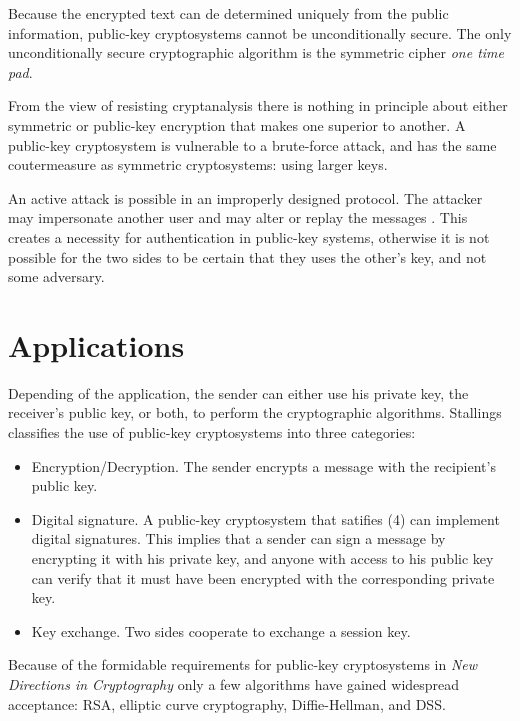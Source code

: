 \documentclass[english,titlepage,11pt]{article}
\begin{document}
Because the encrypted text can de determined uniquely from the public information, public-key cryptosystems cannot be unconditionally secure\cite{diffie76}. The only unconditionally secure cryptographic algorithm is the symmetric cipher \emph{one time pad}\cite{kahn67}. 

From the view of resisting cryptanalysis there is nothing in principle about either symmetric or public-key encryption that makes one superior to another\cite{stallings06}. A public-key cryptosystem is vulnerable to a brute-force attack, and has the same coutermeasure as symmetric cryptosystems: using larger keys.

An active attack is possible in an improperly designed protocol. The attacker may impersonate another user and may alter or replay the messages \cite{dolev83,menezes01}. This creates a necessity for authentication in public-key systems, otherwise it is not possible for the two sides to be certain that they uses the other's key, and not some adversary.

\section{Applications}

Depending of the application, the sender can either use his private key, the receiver's public key, or both, to perform the cryptographic algorithms. Stallings classifies the use of public-key cryptosystems into three categories\cite{stallings06}:

\begin{itemize}
  \item Encryption/Decryption. The sender encrypts a message with the recipient's public key.
  \item Digital signature. A public-key cryptosystem that satifies (4) can implement digital signatures\cite{diffie76,rsa78}. This implies that a sender can sign a message by encrypting it with his private key, and anyone with access to his public key can verify that it must have been encrypted with the corresponding private key.
  \item Key exchange. Two sides cooperate to exchange a session key. 
\end{itemize}

Because of the formidable requirements for public-key cryptosystems in \emph{New Directions in Cryptography}\cite{diffie76} only a few algorithms have gained widespread acceptance\cite{stallings06}: RSA, elliptic curve cryptography, Diffie-Hellman, and DSS.
\end{document}
